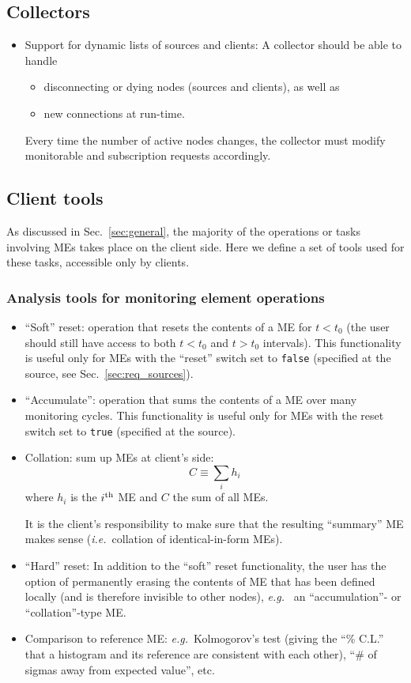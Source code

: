\documentclass{cmspaper}
\newcommand {\ie}{\mbox{\sl i.e. }}     %
\newcommand {\eg}{\mbox{\sl e.g. }}     %
\begin{document}
\subsection{Collectors}
\label{sec:req_collectors}
\begin{itemize}
\item{Support for dynamic lists of sources and clients: A collector
should be able to handle 
\begin{itemize}
\item{disconnecting or dying nodes (sources and
clients), as well as}
\item{new connections at run-time.}
\end{itemize}
Every time the number of active nodes changes, the collector must
modify monitorable and subscription requests accordingly.}
\end{itemize}
%
%
\subsection{Client tools}
\label{sec:tools}
%
As discussed in Sec.~\ref{sec:general}, the majority of the operations
or tasks involving MEs takes place on the client side. Here we define
a set of tools used for these tasks, accessible only by clients.
%
\subsubsection{Analysis tools for monitoring element operations}
\label{sec:analysis_tools}
%
\begin{itemize}
\item{``Soft'' reset: operation that resets the contents of a ME 
for $t < t_0$ (the user should still have access to both $t < t_0$ and
$t > t_0$ intervals). This functionality is useful only for MEs
with the ``reset'' switch set to {\tt false} (specified at the source, see
Sec.~\ref{sec:req_sources}).}

\item{``Accumulate'': operation that sums the contents of a ME
 over many monitoring cycles. This functionality is useful only
for MEs with the reset switch set to {\tt true} (specified at
the source)}.

\item{Collation: sum up MEs at client's side: 
$$C \equiv \sum_i h_i $$
where $h_i$ is the $i^{\rm th}$ ME and $C$ the sum of all MEs.

It is the client's responsibility to make sure that the resulting ``summary''
ME makes sense (\ie collation of identical-in-form
MEs).}

\item{``Hard'' reset: In addition to the ``soft'' reset functionality, the
user has the option of permanently erasing the contents of ME that has
been defined locally (and is therefore invisible to other nodes), \eg
an ``accumulation''- or ``collation''-type ME.}

\item{Comparison to reference ME: \eg Kolmogorov's test (giving the ``\% C.L.''
that a histogram and its reference are consistent with each other),
``\# of sigmas away from expected value'', etc.}

\end{itemize}
%
%
\end{document}
